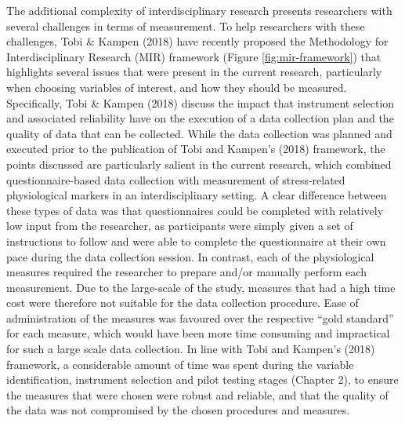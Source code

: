 \documentclass[
  english,
  man,floatsintext]{apa6}
\begin{document}
The additional complexity of interdisciplinary research presents researchers with several challenges in terms of measurement.
To help researchers with these challenges, Tobi \& Kampen (2018) have recently proposed the Methodology for Interdisciplinary Research (MIR) framework (Figure \ref{fig:mir-framework}) that highlights several issues that were present in the current research, particularly when choosing variables of interest, and how they should be measured.
Specifically, Tobi \& Kampen (2018) discuss the impact that instrument selection and associated reliability have on the execution of a data collection plan and the quality of data that can be collected.
While the data collection was planned and executed prior to the publication of Tobi and Kampen's (2018) framework, the points discussed are particularly salient in the current research, which combined questionnaire-based data collection with measurement of stress-related physiological markers in an interdisciplinary setting.
A clear difference between these types of data was that questionnaires could be completed with relatively low input from the researcher, as participants were simply given a set of instructions to follow and were able to complete the questionnaire at their own pace during the data collection session.
In contrast, each of the physiological measures required the researcher to prepare and/or manually perform each measurement. Due to the large-scale of the study, measures that had a high time cost were therefore not suitable for the data collection procedure.
Ease of administration of the measures was favoured over the respective \enquote{gold standard} for each measure, which would have been more time consuming and impractical for such a large scale data collection.
In line with Tobi and Kampen's (2018) framework, a considerable amount of time was spent during the variable identification, instrument selection and pilot testing stages (Chapter 2), to ensure the measures that were chosen were robust and reliable, and that the quality of the data was not compromised by the chosen procedures and measures.
\end{document}
